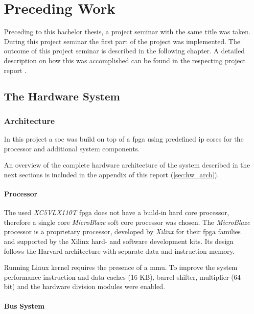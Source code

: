 \chapter{Preceding Work}

Preceding to this bachelor thesis, a project seminar with the same title was taken. During this project seminar the first part of the project was implemented. The outcome of this project seminar is described in the following chapter. A detailed description on how this was accomplished can be found in the respecting project report \cite{projectseminar}.

\section{The Hardware System}

\subsection{Architecture}

In this project a \gls{soc} was build on top of a \gls{fpga} using predefined \gls{ip} cores for the processor and additional system components.

An overview of the complete hardware architecture of the system described in the next sections is included in the appendix of this report (\ref{sec:hw_arch}).

\subsubsection{Processor}
\label{subsubsec:microblaze}

The used \textit{XC5VLX110T} \gls{fpga} does not have a build-in hard core processor, therefore a single core \textit{MicroBlaze} soft core processor was chosen. The \textit{MicroBlaze} processor is a proprietary processor, developed by \textit{Xilinx} for their \gls{fpga} families and supported by the Xilinx hard- and software development kits. Its design follows the Harvard architecture with separate data and instruction memory.

Running Linux kernel requires the presence of a \gls{mmu}. To improve the system performance instruction and data caches (16 KB), barrel shifter, multiplier (64 bit) and the hardware division modules were enabled.

\subsubsection{Bus System}


